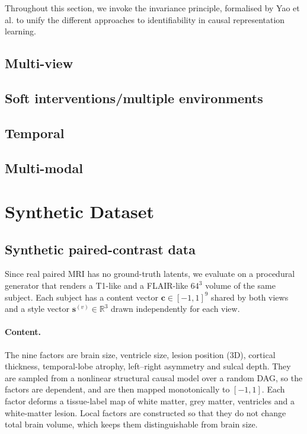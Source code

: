 \documentclass{article}
\begin{document}
Throughout this section, we invoke the invariance principle, formalised by Yao et al. to unify the different approaches to identifiability in causal representation learning.

\subsection{Multi-view}

\subsection{Soft interventions/multiple environments}

\subsection{Temporal}

\subsection{Multi-modal}

\section{Synthetic Dataset}

\subsection{Synthetic paired-contrast data}
\label{sec:synthetic-data}

Since real paired MRI has no ground-truth latents, we evaluate on a procedural
generator that renders a T1-like and a FLAIR-like $64^3$ volume of the same
subject. Each subject has a content vector $\mathbf{c}\in[-1,1]^{9}$ shared by
both views and a style vector $\mathbf{s}^{(v)}\in\mathbb{R}^{3}$ drawn
independently for each view.

\paragraph{Content.}
The nine factors are brain size, ventricle size, lesion position (3D),
cortical thickness, temporal-lobe atrophy, left--right asymmetry and sulcal
depth. They are sampled from a nonlinear structural causal model over a random
DAG, so the factors are dependent, and are then mapped monotonically to
$[-1,1]$. Each factor deforms a tissue-label map of white matter, grey matter,
ventricles and a white-matter lesion. Local factors are constructed so that
they do not change total brain volume, which keeps them distinguishable from
brain size.
\end{document}
